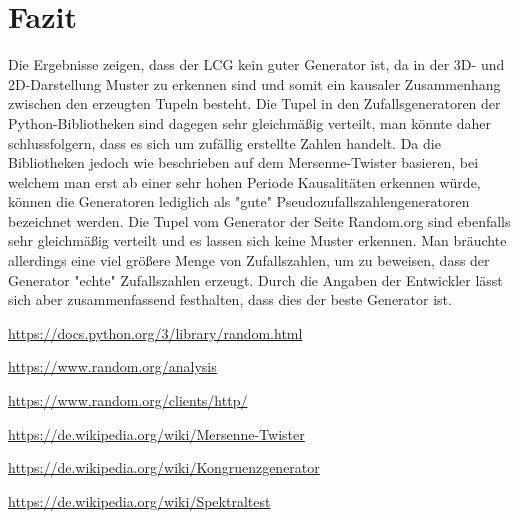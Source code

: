 \documentclass[12pt]{article}
\begin{document}
    \section{Fazit}\label{sec:fazit}
    Die Ergebnisse zeigen, dass der LCG kein guter Generator ist,
    da in der 3D- und 2D-Darstellung Muster zu erkennen sind und somit ein kausaler Zusammenhang zwischen den erzeugten Tupeln besteht.
    Die Tupel in den Zufallsgeneratoren der Python-Bibliotheken sind dagegen sehr gleichmäßig verteilt,
    man könnte daher schlussfolgern, dass es sich um zufällig erstellte Zahlen handelt.
    Da die Bibliotheken jedoch wie beschrieben auf dem Mersenne-Twister basieren, bei welchem man erst ab einer sehr hohen Periode Kausalitäten erkennen würde,
    können die Generatoren lediglich als "gute" Pseudozufallszahlengeneratoren bezeichnet werden.
    Die Tupel vom Generator der Seite Random.org sind ebenfalls sehr gleichmäßig verteilt und es lassen sich keine Muster erkennen.
    Man bräuchte allerdings eine viel größere Menge von Zufallszahlen, um zu beweisen, dass der Generator "echte" Zufallszahlen erzeugt.
    Durch die Angaben der Entwickler lässt sich aber zusammenfassend festhalten, dass dies der beste Generator ist.


    \vfill

    \begin{thebibliography}{12345}

        \url{https://docs.python.org/3/library/random.html}

        \url{https://www.random.org/analysis}

        \url{https://www.random.org/clients/http/}

        \url{https://de.wikipedia.org/wiki/Mersenne-Twister}

        \url{https://de.wikipedia.org/wiki/Kongruenzgenerator}

        \url{https://de.wikipedia.org/wiki/Spektraltest}

    \end{thebibliography}
\end{document}
